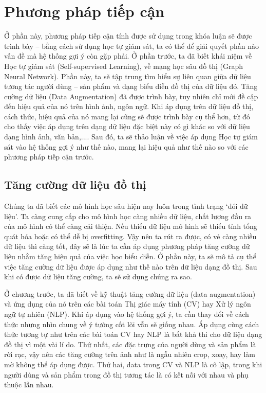 \chapter{Phương pháp tiếp cận}
\noindent Ở phần này, phương pháp tiếp cận tính được sử dụng trong khóa luận sẽ được trình bày -- bằng cách sử dụng học tự giám sát, ta có thể để giải quyết phần nào vấn đề mà hệ thống gợi ý còn gặp phải. Ở phần trước, ta đã biết khái niệm về Học tự giám sát (Self-supervised Learning), về mạng học sâu đồ thị (Graph Neural Network). Phần này, ta sẽ tập trung tìm hiểu sự liên quan giữa dữ liệu tương tác người dùng -- sản phẩm và dạng biểu diễn đồ thị của dữ liệu đó. Tăng cường dữ liệu (Data Augmentation) đã được trình bày, tuy nhiên chỉ mới đề cập đến hiệu quả của nó trên hình ảnh, ngôn ngữ. Khi áp dụng trên dữ liệu đồ thị, cách thức, hiệu quả của nó mang lại cũng sẽ được trình bày cụ thể hơn, từ đó cho thấy việc áp dụng trên dạng dữ liệu đặc biệt này có gì khác so với dữ liệu dạng hình ảnh, văn bản,.... Sau đó, ta sẽ thảo luận về việc áp dụng Học tự giám sát vào hệ thống gợi ý như thế nào, mang lại hiệu quả như thế nào so với các phương pháp tiếp cận trước.

\section{Tăng cường dữ liệu đồ thị} \label{3.1-data-aug}

\noindent Chúng ta đã biết các mô hình học sâu hiện nay luôn trong tình trạng `đói dữ liệu'. Ta càng cung cấp cho mô hình học càng nhiều dữ liệu, chất lượng đầu ra của mô hình có thể càng cải thiện. Nếu thiếu dữ liệu mô hình sẽ thiếu tính tổng quát hóa hoặc có thể dễ bị overfitting. Vậy nên ta rút ra được, có vẻ càng nhiều dữ liệu thì càng tốt, đây sẽ là lúc ta cần áp dụng phương pháp tăng cường dữ liệu nhằm tăng hiệu quả của việc học biểu diễn. Ở phần này, ta sẽ mô tả cụ thể việc tăng cường dữ liệu được áp dụng như thế nào trên dữ liệu dạng đồ thị. Sau khi có được dữ liệu tăng cường, ta sẽ sử dụng chúng ra sao.

Ở chương trước, ta đã biết về kỹ thuật tăng cường dữ liệu (data augmentation) và ứng dụng của nó trên các bài toán Thị giác máy tính (CV) hay Xử lý ngôn ngữ tự nhiên (NLP). Khi áp dụng vào hệ thống gợi ý, ta cần thay đổi về cách thức nhưng nhìn chung về ý tưởng cốt lõi vẫn sẽ giống nhau. Áp dụng cùng cách thức tương tự như trên các bài toán CV hay NLP là bất khả thi \cite{SGL} cho dữ liệu dạng đồ thị vì một vài lí do. Thứ nhất, các đặc trưng của người dùng và sản phẩm là rời rạc, vậy nên các tăng cường trên ảnh như là ngẫu nhiên crop, xoay, hay làm mờ không thể áp dụng được. Thứ hai, data trong CV và NLP là cô lập, trong khi người dùng và sản phẩm trong đồ thị tương tác là có kết nối với nhau và phụ thuộc lẫn nhau.

